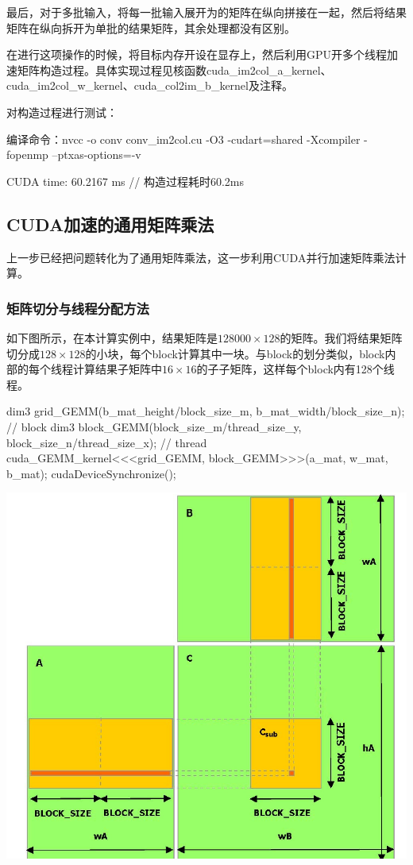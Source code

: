 \documentclass[UTF8,10pt]{ctexart}
\begin{document}
最后，对于多批输入，将每一批输入展开为的矩阵在纵向拼接在一起，然后将结果矩阵在纵向拆开为单批的结果矩阵，其余处理都没有区别。

在进行这项操作的时候，将目标内存开设在显存上，然后利用GPU开多个线程加速矩阵构造过程。具体实现过程见核函数cuda\_im2col\_a\_kernel、cuda\_im2col\_w\_kernel、cuda\_col2im\_b\_kernel及注释。

对构造过程进行测试：
\begin{python}
编译命令：nvcc -o conv conv_im2col.cu -O3 -cudart=shared -Xcompiler -fopenmp --ptxas-options=-v
\end{python}
\begin{python}
CUDA time: 60.2167 ms  // 构造过程耗时60.2ms
\end{python}

\subsection{CUDA加速的通用矩阵乘法}
上一步已经把问题转化为了通用矩阵乘法，这一步利用CUDA并行加速矩阵乘法计算。
\subsubsection{矩阵切分与线程分配方法}
如下图所示，在本计算实例中，结果矩阵是$128000\times 128$的矩阵。我们将结果矩阵切分成$128\times 128$的小块，每个block计算其中一块。与block的划分类似，block内部的每个线程计算结果子矩阵中$16\times 16$的子子矩阵，这样每个block内有128个线程。
\begin{python}
dim3 grid_GEMM(b_mat_height/block_size_m, b_mat_width/block_size_n);    // block
dim3 block_GEMM(block_size_m/thread_size_y, block_size_n/thread_size_x);    // thread
cuda_GEMM_kernel<<<grid_GEMM, block_GEMM>>>(a_mat, w_mat, b_mat);
cudaDeviceSynchronize();
\end{python}
\begin{center}
\includegraphics[scale=0.4]{img/2.png}
\end{center}
\end{document}

